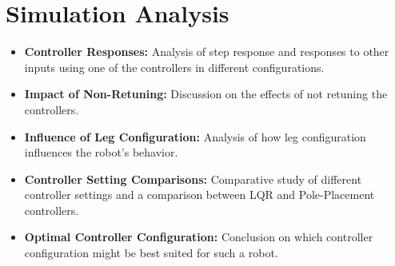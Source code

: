 \section{Simulation Analysis}
\begin{itemize}
	\item \textbf{Controller Responses:} Analysis of step response and responses to other inputs using one of the controllers in different configurations.
	\item \textbf{Impact of Non-Retuning:} Discussion on the effects of not retuning the controllers.
	\item \textbf{Influence of Leg Configuration:} Analysis of how leg configuration influences the robot's behavior.
	\item \textbf{Controller Setting Comparisons:} Comparative study of different controller settings and a comparison between LQR and Pole-Placement controllers.
	\item \textbf{Optimal Controller Configuration:} Conclusion on which controller configuration might be best suited for such a robot.
\end{itemize}










	


